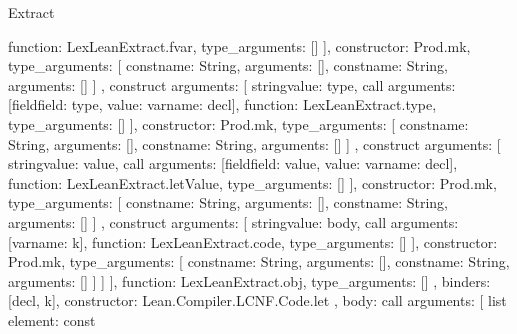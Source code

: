 \begin{lexlean}{Extract}
\begin{toolingmodule}
{{{{{{{{                          function: LexLeanExtract.fvar,
                          type_arguments: []
                        }
                      ],
                      constructor: Prod.mk,
                      type_arguments: [
                        const{name: String, arguments: []},
                        const{name: String, arguments: []}
                      ]
                    },
                    construct{
                      arguments: [
                        string{value: type},
                        call{
                          arguments: [field{field: type, value: var{name: decl}}],
                          function: LexLeanExtract.type,
                          type_arguments: []
                        }
                      ],
                      constructor: Prod.mk,
                      type_arguments: [
                        const{name: String, arguments: []},
                        const{name: String, arguments: []}
                      ]
                    },
                    construct{
                      arguments: [
                        string{value: value},
                        call{
                          arguments: [field{field: value, value: var{name: decl}}],
                          function: LexLeanExtract.letValue,
                          type_arguments: []
                        }
                      ],
                      constructor: Prod.mk,
                      type_arguments: [
                        const{name: String, arguments: []},
                        const{name: String, arguments: []}
                      ]
                    },
                    construct{
                      arguments: [
                        string{value: body},
                        call{
                          arguments: [var{name: k}],
                          function: LexLeanExtract.code,
                          type_arguments: []
                        }
                      ],
                      constructor: Prod.mk,
                      type_arguments: [
                        const{name: String, arguments: []},
                        const{name: String, arguments: []}
                      ]
                    }
                  ]
                }
              ],
              function: LexLeanExtract.obj,
              type_arguments: []
            },
            binders: [decl, k],
            constructor: Lean.Compiler.LCNF.Code.let
          },
          {
            body: call{
              arguments: [
                list{
                  element: const{
}}}}}}}
\end{toolingmodule}
\end{lexlean}
